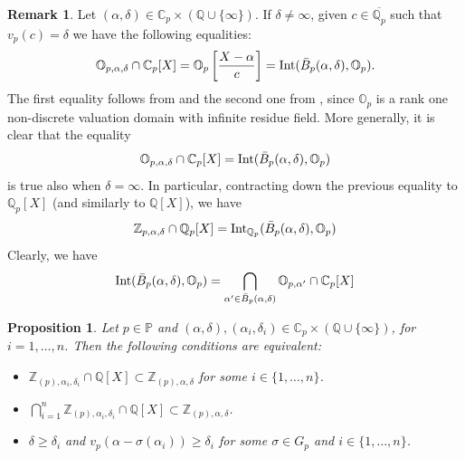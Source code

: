\documentclass[10pt]{article}
\numberwithin{equation}{section}
\newtheorem{Prop}[equation]{Proposition}
\theoremstyle{definition}
\newtheorem{Rem}[equation]{Remark}
\theoremstyle{definition}
\newcommand{\Q}{\mathbb{Q}}
\newcommand{\Z}{\mathbb{Z}}
\newcommand{\C}{\mathbb{C}}
\renewcommand{\O}{\mathbb{O}}
\newcommand{\PP}{\mathbb{P}}
\newcommand{\Int}{\textnormal{Int}}
\newcommand{\oQp}{\overline{\Q_p}}
\newcommand{\oZp}{\overline{\Z_p}}
\newcommand\bc { \color{blue}}
\begin{document}
\begin{Rem}\label{balls and intval rings}
  Let $(\alpha,\delta)\in\C_p\times(\Q\cup\{\infty\})$. If $\delta\not=\infty$, given $c\in\oQp$ such that $v_p(c)=\delta$ we have the following equalities:
$$
\O_{p,\alpha,\delta}\cap\C_p[X]=\O_p\left[\frac{X-\alpha}{c}\right]=\Int(\bar B_p(\alpha,\delta),\O_p).$$
The first equality follows from \cite[Remark 3.4]{PerPrufer} and the second one  
from \cite[Lemma 4.1]{PerPrufer}, since $\O_p$ is a rank one non-discrete valuation domain with infinite residue field. More generally, it is clear that the equality
\begin{equation}\label{restriction valuation domain on polynomial ring}
\O_{p,\alpha,\delta}\cap\C_p[X]=\Int(\bar B_p(\alpha,\delta),\O_p)
\end{equation}
is true also when $\delta=\infty$.
In particular, contracting down the previous equality to $\Q_p[X]$ (and similarly to $\Q[X]$), we have
\begin{equation}\label{IntQpB}
\Z_{p,\alpha,\delta}\cap\Q_p[X]=\Int_{\Q_p}(\bar B_p(\alpha,\delta),\O_p)
\end{equation}
Clearly, we have
\begin{equation}\label{IntQpB2}
\Int(\bar B_p(\alpha,\delta),\O_p)=\bigcap_{\alpha'\in \bar B_p(\alpha,\delta)}\O_{p,\alpha'}\cap\C_p[X]
\end{equation}
  
\end{Rem}

\begin{Prop}\label{overring intersection DVRs}
Let $p\in\PP$ and $(\alpha,\delta),(\alpha_i,\delta_i)\in\C_p\times(\Q\cup\{\infty\})$, for $i=1,\ldots,n$.
Then the following conditions are equivalent:
\begin{itemize}
\item[{\em (1)}] $\Z_{(p),\alpha_i,\delta_i}\cap\Q[X]\subset\Z_{(p),\alpha,\delta}$ for some $i\in\{1,\ldots,n\}$.
\item[{\em (2)}] $\bigcap\limits_{i=1}^n\Z_{(p),\alpha_i,\delta_i}\cap\Q[X] \subset\Z_{(p),\alpha,\delta}$.
\item[{\em (3)}] $\delta\geq\delta_i$ and $v_p(\alpha-\sigma(\alpha_i))\geq\delta_i$ for some $\sigma\in G_p$ and $i\in\{1,\ldots,n\}$.
\end{itemize}
\end{Prop}
\end{document}
